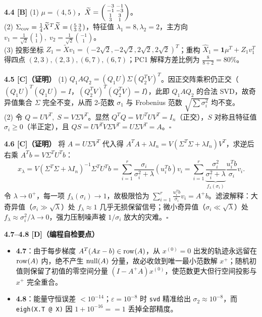 \textbf{4.4 [B]}
(1) $\mu = (4,5)$，$\widetilde{X} = \begin{psmallmatrix}-3&-1\\-1&-3\\1&3\\3&1\end{psmallmatrix}$。\\
(2) $\Sigma_{\text{cov}} = \frac{1}{4}\widetilde{X}^T\widetilde{X} = \begin{psmallmatrix}5&3\\3&5\end{psmallmatrix}$，特征值 $\lambda_1=8, \lambda_2=2$，主方向 $v_1 = \frac{1}{\sqrt{2}}\binom{1}{1},\; v_2 = \frac{1}{\sqrt{2}}\binom{-1}{1}$。\\
(3) 投影坐标 $Z_1 = \widetilde{X}v_1 = (-2\sqrt{2}, -2\sqrt{2}, 2\sqrt{2}, 2\sqrt{2})^T$；重构 $\widehat{X}_1 = \mathbf{1}\mu^T + Z_1 v_1^T$ 得四点 $(2,3),\allowbreak(2,3),\allowbreak(6,7),\allowbreak(6,7)$；PC1 解释方差比例为 $\frac{8}{8+2} = 80\%$。

\textbf{4.5 [C]（证明）}
(1) $Q_1 A Q_2 = (Q_1 U)\Sigma (Q_2^T V)^T$。因正交阵乘积仍正交（$(Q_1U)^T(Q_1U)=I$，$(Q_2^TV)^T(Q_2^TV)=I$），此即 $Q_1 A Q_2$ 的合法 SVD，故奇异值集合 $\Sigma$ 完全不变，从而 2-范数 $\sigma_1$ 与 Frobenius 范数 $\sqrt{\sum\sigma_i^2}$ 均不变。\\
(2) 令 $Q = UV^T,\; S = V\Sigma V^T$。显然 $Q^TQ = VU^TUV^T = I_n$（正交），$S$ 对称且特征值 $\sigma_i\ge 0$（半正定），且 $QS = UV^TV\Sigma V^T = U\Sigma V^T = A$。$\square$

\textbf{4.6 [C]（证明）}
将 $A = U\Sigma V^T$ 代入得 $A^TA + \lambda I_n = V(\Sigma^T\Sigma + \lambda I_n)V^T$，求逆后右乘 $A^T b = V\Sigma^T U^T b$：
\[
  x_\lambda = V(\Sigma^T\Sigma + \lambda I_n)^{-1}\Sigma^T U^T b
  = \sum_{i=1}^r \frac{\sigma_i}{\sigma_i^2 + \lambda}(u_i^T b) v_i
  = \sum_{i=1}^r \underbrace{\frac{\sigma_i^2}{\sigma_i^2+\lambda}}_{f_\lambda(\sigma_i)} \frac{u_i^T b}{\sigma_i} v_i.
\]
令 $\lambda \to 0^+$，每一项 $f_\lambda(\sigma_i) \to 1$，故极限恰为 $\sum_{i=1}^r \frac{u_i^T b}{\sigma_i}v_i = A^+ b$。滤波解释：大奇异值（$\sigma_i \gg \sqrt{\lambda}$）处 $f_\lambda \approx 1$ 几乎无损保留信号；微小奇异值（$\sigma_i \ll \sqrt{\lambda}$）处 $f_\lambda \approx \sigma_i^2/\lambda \to 0$，强力压制噪声被 $1/\sigma_i$ 放大的灾难。$\square$

\textbf{4.7--4.8 [D]（编程自检要点）}
\begin{itemize}
  \item \textbf{4.7}：由于每步梯度 $A^T(Ax-b) \in \operatorname{row}(A)$，从 $x^{(0)}=0$ 出发的轨迹永远留在 $\operatorname{row}(A)$ 内，绝不产生 $\operatorname{null}(A)$ 分量，故必收敛到唯一最小范数解 $x^+$；随机初值则保留了初值的零空间分量 $(I-A^+A)x^{(0)}$，使范数更大但行空间投影与 $x^+$ 完全重合。
  \item \textbf{4.8}：能量守恒误差 $<10^{-14}$；$\varepsilon=10^{-8}$ 时 \texttt{svd} 精准给出 $\sigma_2 \approx 10^{-8}$，而 \texttt{eigh(X.T @ X)} 因 $1 + 10^{-16} == 1$ 丢掉全部精度。
\end{itemize}

